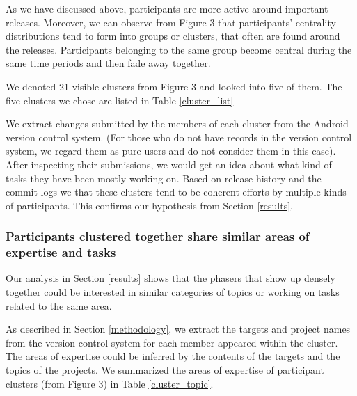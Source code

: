 \documentclass[10pt, conference, compsocconf]{IEEEtran}
\begin{document}
As we have discussed above, participants are more active around
important releases. Moreover, we can observe from Figure 3 that
participants' centrality distributions tend to form into groups or
clusters, that often
are found around the releases.
Participants belonging to the same group become central during
the same time periods and then fade away together.

We denoted 21 visible clusters from Figure 3 and looked into five of them. 
The five clusters we chose are listed in Table \ref{cluster_list}

We extract changes submitted by the members of each cluster from the
Android version control system. (For those who do not have records in
the version control system, we regard them as pure users and do not
consider them in this case). After inspecting their submissions, we
would get an idea about what kind of tasks they have been mostly
working on.  
Based on release history and the commit logs we 
that these clusters tend to be coherent efforts by multiple kinds of participants.
This confirms our hypothesis
from Section \ref{results}.




\subsubsection{Participants clustered together share similar areas of expertise and tasks}

Our analysis in Section \ref{results} shows that the phasers that show
up densely together could be interested in similar categories of
topics or working on tasks related to the same area.


As described in Section \ref{methodology}, we extract the targets and
project names from the version control system for each member appeared
within the cluster. The areas of expertise could be inferred by the contents
of the targets and the topics of the projects. We summarized the
areas of expertise of participant clusters (from Figure 3)
 in Table \ref{cluster_topic}.


\end{document}
